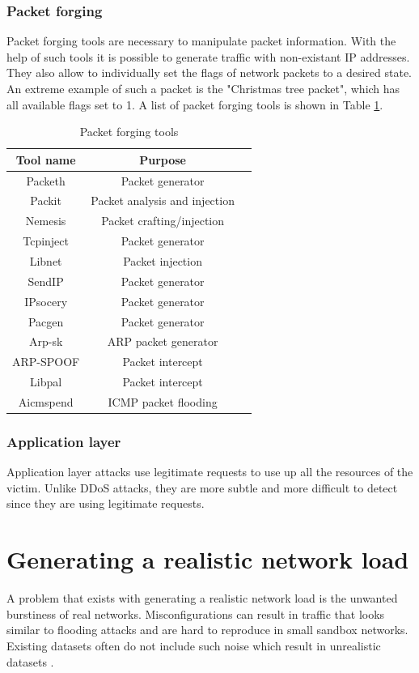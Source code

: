 \documentclass[conference]{IEEEtran}
\begin{document}
\smallskip
\subsubsection{Packet forging}
Packet forging tools are necessary to manipulate packet information. With the help of such tools it is possible to generate traffic with non-existant IP addresses. They also allow to individually set the flags of network packets to a desired state. An extreme example of such a packet is the "Christmas tree packet", which has all available flags set to 1. A list of packet forging tools is shown in Table \ref{table:packetforging-tools}.


\begin{table}[htbp]
\caption{Packet forging tools \cite{b1}} 
\centering
\begin{tabular}{ | c | c | c |}
\hline
Tool name & Purpose \\
\hline
Packeth & Packet generator	 \\
Packit & Packet analysis and injection	 \\
Nemesis & Packet crafting/injection	 \\
Tcpinject & Packet generator	 \\
Libnet & Packet injection	 \\
SendIP & Packet generator	 \\
IPsocery & Packet generator	 \\
Pacgen & Packet generator	 \\
Arp-sk & ARP packet generator	 \\
ARP-SPOOF & Packet intercept	 \\
Libpal & Packet intercept	 \\
Aicmspend & ICMP packet flooding	\\
\hline
\end{tabular}
\label{table:packetforging-tools}
\end{table}

\smallskip
\subsubsection{Application layer}
Application layer attacks use legitimate requests to use up all the resources of the victim. Unlike DDoS attacks, they are more subtle and more difficult to detect since they are using legitimate requests. 

\smallskip
\section{Generating a realistic network load}
A problem that exists with generating a realistic network load is the unwanted burstiness of real networks. Misconfigurations can result in traffic that looks similar to flooding attacks \cite{b10} and are hard to reproduce in small sandbox networks. Existing datasets often do not include such noise which result in unrealistic datasets \cite{b10}.
 
\end{document}
